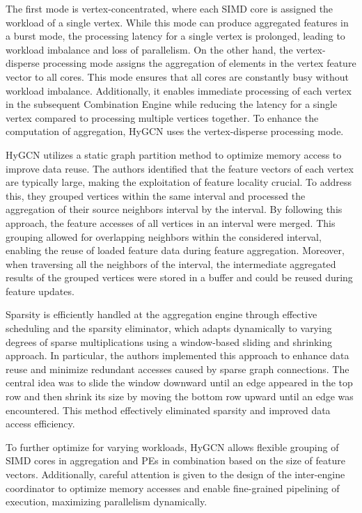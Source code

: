 The first mode is vertex-concentrated, where each SIMD core is assigned the workload of a single vertex.
While this mode can produce aggregated features in a burst mode, the processing latency for a single vertex is prolonged, leading to workload imbalance and loss of parallelism.
On the other hand, the vertex-disperse processing mode assigns the aggregation of elements in the vertex feature vector to all cores.
This mode ensures that all cores are constantly busy without workload imbalance.
Additionally, it enables immediate processing of each vertex in the subsequent Combination Engine while reducing the latency for a single vertex compared to processing multiple vertices together.
To enhance the computation of aggregation, HyGCN uses the vertex-disperse processing mode.

HyGCN utilizes a static graph partition method to optimize memory access to improve data reuse.
The authors identified that the feature vectors of each vertex are typically large, making the exploitation of feature locality crucial.
To address this, they grouped vertices within the same interval and processed the aggregation of their source neighbors interval by the interval.
By following this approach, the feature accesses of all vertices in an interval were merged.
This grouping allowed for overlapping neighbors within the considered interval, enabling the reuse of loaded feature data during feature aggregation.
Moreover, when traversing all the neighbors of the interval, the intermediate aggregated results of the grouped vertices were stored in a buffer and could be reused during feature updates.

Sparsity is efficiently handled at the aggregation engine through effective scheduling and the sparsity eliminator, which adapts dynamically to varying degrees of sparse multiplications using a window-based sliding and shrinking approach.
In particular, the authors implemented this approach to enhance data reuse and minimize redundant accesses caused by sparse graph connections.
The central idea was to slide the window downward until an edge appeared in the top row and then shrink its size by moving the bottom row upward until an edge was encountered.
This method effectively eliminated sparsity and improved data access efficiency.

To further optimize for varying workloads, HyGCN allows flexible grouping of SIMD cores in aggregation and PEs in combination based on the size of feature vectors.
Additionally, careful attention is given to the design of the inter-engine coordinator to optimize memory accesses and enable fine-grained pipelining of execution, maximizing parallelism dynamically.

